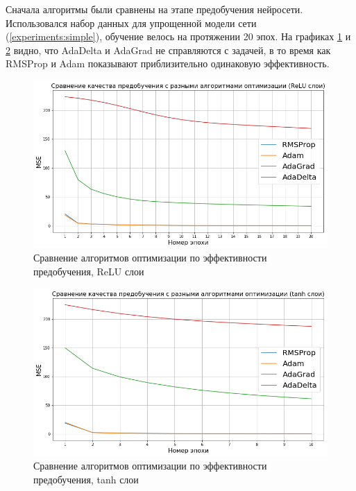 \documentclass[specification, annotation]{itmo-student-thesis}
\begin{document}
Сначала алгоритмы были сравнены на этапе предобучения нейросети. Использовался
набор данных для упрощенной модели сети (\ref{experiments:simple}), обучение
велось на протяжении 20 эпох. На графиках
\ref{experiment-optimizers-pretrain-relu} и
\ref{experiment-optimizers-pretrain-tanh} видно, что AdaDelta и AdaGrad не
справляются с задачей, в то время как RMSProp и Adam показывают приблизительно
одинаковую эффективность.

\begin{figure}[!h]
  \caption{Сравнение алгоритмов оптимизации по эффективности
    предобучения, ReLU слои}\label{experiment-optimizers-pretrain-relu}
  \centering
  \includegraphics[scale=0.6]{experiment-optimizers-pretrain-relu}
\end{figure}

\begin{figure}[!h]
  \caption{Сравнение алгоритмов оптимизации по эффективности
    предобучения, tanh слои}\label{experiment-optimizers-pretrain-tanh}
  \centering
  \includegraphics[scale=0.6]{experiment-optimizers-pretrain-tanh}
\end{figure}
\end{document}
